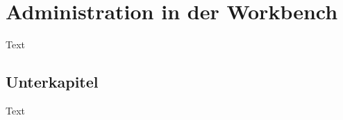 \chapter{Administration in der Workbench}
\label{Kapitel:Einleitung}
Text


\section{Unterkapitel}
\label{Abschnitt:Motivation}


Text
